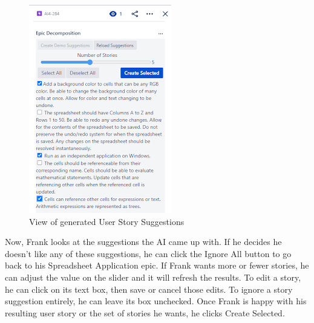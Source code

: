 \begin{figure}
\centerline{\includegraphics[scale=0.65,width=\textwidth,height=\textheight,keepaspectratio]{./figure/Scenario1Figure2.png}}
\caption{View of generated User Story Suggestions}
\end{figure}

Now, Frank looks at the suggestions the AI came up with. If he decides he doesn’t like any of these suggestions, he can click the Ignore All button to go back to his Spreadsheet Application epic. If Frank wants more or fewer stories, he can adjust the value on the slider and it will refresh the results. To edit a story, he can click on its text box, then save or cancel those edits. To ignore a story suggestion entirely, he can leave its box unchecked. Once Frank is happy with his resulting user story or the set of stories he wants, he clicks Create Selected. 


